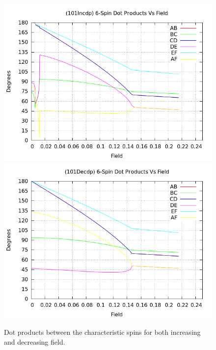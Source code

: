 \documentclass{article}
\begin{document}
\begin{center}
\begin{figure}
\centering
\includegraphics[scale=0.5]{HVariedData/Pictures/101Incdp.png}
\includegraphics[scale=0.5]{HVariedData/Pictures/101Decdp.png}
\caption{Dot products between the characteristic spins for both increasing and decreasing field.}
\end{figure}
\end{center}
\clearpage
\end{document}
